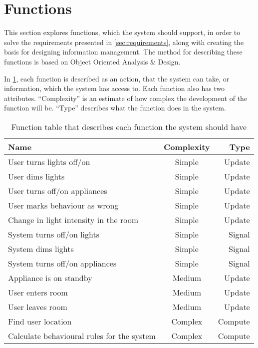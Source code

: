 \section{Functions}\label{sec:functions}
This section explores functions, which the system should support, in order to solve the requirements presented in \cref{sec:requirements}, along with creating the basis for designing information management. The method for describing these functions is based on Object Oriented Analysis \& Design\cite{OOAD}.

In \cref{table:functionlist}, each function is described as an action, that the system can take, or information, which the system has access to. Each function also has two attributes. \enquote{Complexity} is an estimate of how complex the development of the function will be. \enquote{Type} describes what the function does in the system\cite{OOAD}.

\begin{table}[hbtp]
\centering
\begin{tabular}{lcr}
\toprule
\textbf{Name}																& \textbf{Complexity}	& \textbf{Type} \\
\midrule
User turns lights off/on				& Simple	& Update  \\
User dims lights					& Simple	& Update  \\
User turns off/on appliances			& Simple	& Update  \\
User marks behaviour as wrong			& Simple	& Update  \\
Change in light intensity in the room		& Simple	& Update  \\
System turns off/on lights			& Simple	& Signal  \\
System dims lights				& Simple	& Signal  \\
System turns off/on appliances			& Simple	& Signal  \\
Appliance is on standby				& Medium	& Update  \\
User enters room				& Medium	& Update  \\
User leaves room				& Medium	& Update  \\
Find user location			& Complex	& Compute \\
Calculate behavioural rules for the system	& Complex	& Compute \\
\bottomrule
\end{tabular}
\caption[Function table]{Function table that describes each function the system should have}
\label{table:functionlist}
\end{table}

